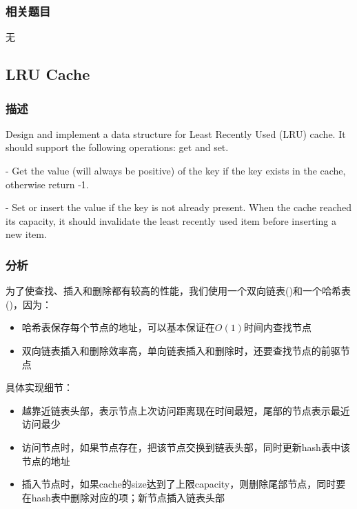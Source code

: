\subsubsection{相关题目}
\begindot
\item 无
\myenddot


\subsection{LRU Cache}
\label{sec:lru-cache}


\subsubsection{描述}
Design and implement a data structure for Least Recently Used (LRU) cache. It should support the following operations: get and set.

 - Get the value (will always be positive) of the key if the key exists in the cache, otherwise return -1.

 - Set or insert the value if the key is not already present. When the cache reached its capacity, it should invalidate the least recently used item before inserting a new item.


\subsubsection{分析}
为了使查找、插入和删除都有较高的性能，我们使用一个双向链表()和一个哈希表()，因为：
\begin{itemize}
\item{哈希表保存每个节点的地址，可以基本保证在$O(1)$时间内查找节点}
\item{双向链表插入和删除效率高，单向链表插入和删除时，还要查找节点的前驱节点}
\end{itemize}

具体实现细节：
\begin{itemize}
\item{越靠近链表头部，表示节点上次访问距离现在时间最短，尾部的节点表示最近访问最少}
\item{访问节点时，如果节点存在，把该节点交换到链表头部，同时更新hash表中该节点的地址}
\item{插入节点时，如果cache的size达到了上限capacity，则删除尾部节点，同时要在hash表中删除对应的项；新节点插入链表头部}              
\end{itemize}


